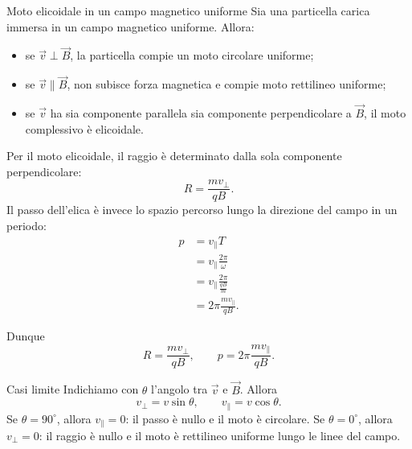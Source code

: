 \documentclass[a4paper]{article}
\begin{document}
\begin{snippetproposition}{Moto elicoidale in un campo magnetico uniforme}
    Sia una particella carica immersa in un campo magnetico uniforme. Allora:
    \begin{itemize}
        \item se \(\vec{v}\perp\vec{B}\), la particella compie un moto circolare uniforme;
        \item se \(\vec{v}\parallel\vec{B}\), non subisce forza magnetica e compie moto rettilineo uniforme;
        \item se \(\vec{v}\) ha sia componente parallela sia componente perpendicolare a \(\vec{B}\), il moto complessivo è elicoidale.
    \end{itemize}
\end{snippetproposition}

\begin{center}
\end{center}

Per il moto elicoidale, il raggio è determinato dalla sola componente perpendicolare:
\[
    R = \frac{mv_{\perp}}{qB}.
\]
Il passo dell'elica è invece lo spazio percorso lungo la direzione del campo in un periodo:
\begin{align*}
    p
    &= v_{\parallel}T \\
    &= v_{\parallel}\frac{2\pi}{\omega} \\
    &= v_{\parallel}\frac{2\pi}{\frac{qB}{m}} \\
    &= 2\pi\frac{mv_{\parallel}}{qB}.
\end{align*}

Dunque
\[
    R = \frac{mv_{\perp}}{qB},
    \qquad
    p = 2\pi\frac{mv_{\parallel}}{qB}.
\]

\begin{snippetexample}{Casi limite}
    Indichiamo con \(\theta\) l'angolo tra \(\vec{v}\) e \(\vec{B}\). Allora
    \[
        v_{\perp}=v\sin\theta,
        \qquad
        v_{\parallel}=v\cos\theta.
    \]
    Se \(\theta=90^\circ\), allora \(v_{\parallel}=0\): il passo è nullo e il moto è circolare. Se \(\theta=0^\circ\), allora \(v_{\perp}=0\): il raggio è nullo e il moto è rettilineo uniforme lungo le linee del campo.
\end{snippetexample}
\end{document}
